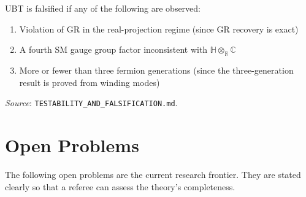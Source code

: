 \documentclass[12pt,a4paper]{article}
\begin{document}
UBT is falsified if any of the following are observed:
\begin{enumerate}
  \item Violation of GR in the real-projection regime (since GR recovery is exact)
  \item A fourth SM gauge group factor inconsistent with
        $\mathbb{H}\otimes_\mathbb{R}\mathbb{C}$
  \item More or fewer than three fermion generations
        (since the three-generation result is proved from winding modes)
\end{enumerate}

\textit{Source}: \texttt{TESTABILITY\_AND\_FALSIFICATION.md}.

\section{Open Problems}
\label{sec:open}

The following open problems are the current research frontier.  They are
stated clearly so that a referee can assess the theory's completeness.
\end{document}
